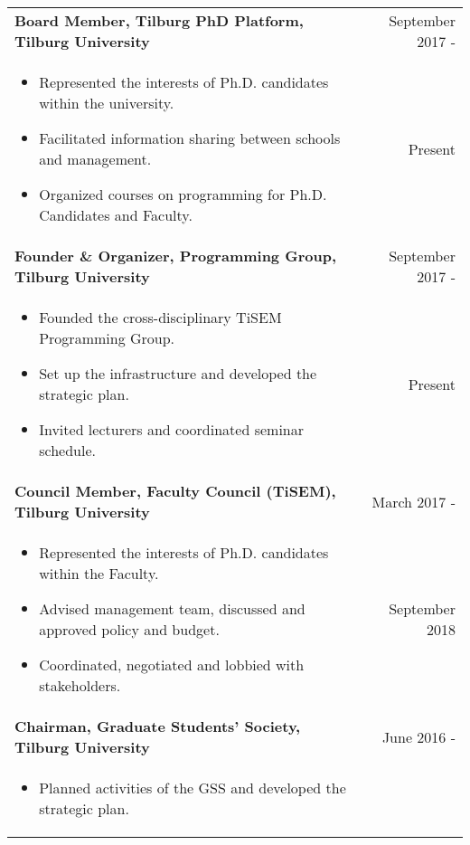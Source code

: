 \documentclass[a4paper,9pt]{article}
\begin{document}
\begin{tabular}{p{15cm}r}
\textbf{Board Member, Tilburg PhD Platform, Tilburg University}  &September 2017 -\\ \vspace{-0.5em}
	\begin{itemize}
		\item Represented the interests of Ph.D. candidates within the university.
		\item Facilitated information sharing between schools and management.
		\item Organized courses on programming for Ph.D. Candidates and Faculty.
	\end{itemize} & Present\phantom{ -}\vspace{-1.0em}\\ 
\textbf{Founder \& Organizer, Programming Group, Tilburg University}  &September 2017 -\\ \vspace{-0.5em}
	\begin{itemize}[noitemsep]
		\item Founded the cross-disciplinary TiSEM Programming Group.
		\item Set up the infrastructure and developed the strategic plan.
		\item Invited lecturers and coordinated seminar schedule.
	\end{itemize} & Present\phantom{ -}\vspace{-1.0em} \\ 
\textbf{Council Member, Faculty Council (TiSEM), Tilburg University}  &March 2017 -\\ \vspace{-0.5em}
	\begin{itemize}[noitemsep]
		\item Represented the interests of Ph.D. candidates within the Faculty.
		\item Advised management team, discussed and approved policy and budget.
		\item Coordinated, negotiated and lobbied with stakeholders.
	\end{itemize} & September 2018\phantom{ -}\vspace{-1.0em} \\
\textbf{Chairman, Graduate Students' Society, Tilburg University}  &June 2016 -\\ \vspace{-0.5em}
	\begin{itemize}[noitemsep]
		\item Planned activities of the GSS and developed the strategic plan.

\end{itemize}
\end{tabular}
\end{document}
